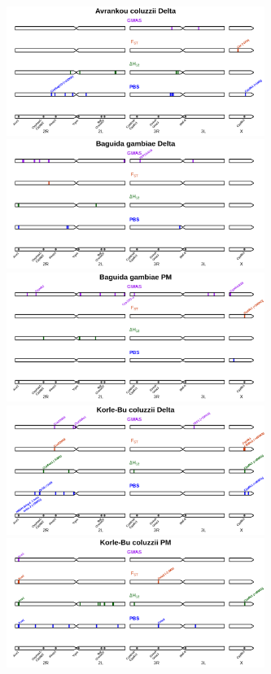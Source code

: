 \documentclass[a4paper,12pt]{article}
\begin{document}
\clearpage

\begin{figure}[h]
	\hspace{-0.3cm}\includegraphics*[width = 8.4cm]{../supplementary_implicated_regions/Avrankou_coluzzii_Delta_implicated_regions.png}
	\vskip 0.4cm
	\hspace{-0.3cm}\includegraphics*[width = 8.4cm]{../supplementary_implicated_regions/Baguida_gambiae_Delta_implicated_regions.png}
	\hspace{-0.3cm}\includegraphics*[width = 8.4cm]{../supplementary_implicated_regions/Baguida_gambiae_PM_implicated_regions.png}
	\vskip 0.4cm
	\hspace{-0.3cm}\includegraphics*[width = 8.4cm]{../supplementary_implicated_regions/Korle-Bu_coluzzii_Delta_implicated_regions.png}
	\hspace{-0.3cm}\includegraphics*[width = 8.4cm]{../supplementary_implicated_regions/Korle-Bu_coluzzii_PM_implicated_regions.png}

\end{figure}
\end{document}
